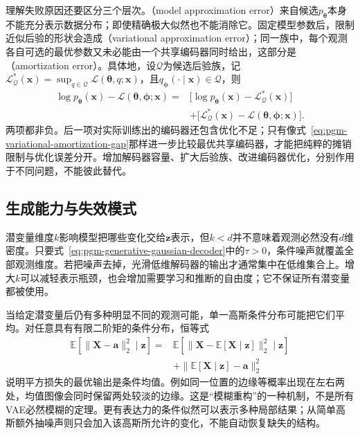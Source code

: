 理解失败原因还要区分三个层次。（model approximation error）来自候选$p_{\bm{\theta}}$本身不能充分表示数据分布；即使精确极大似然也不能消除它。固定模型参数后，限制近似后验的形状会造成（variational approximation error）；同一族中，每个观测各自可选的最优参数又未必能由一个共享编码器同时给出，这部分是（amortization error）。具体地，设$\mathcal{Q}$为候选后验族，记$\mathcal{L}_{\mathcal{Q}}^*(\bm{x})=\sup_{q\in\mathcal{Q}}\mathcal{L}(\bm{\theta},q;\bm{x})$，且$q_{\bm{\phi}}(\cdot\mid\bm{x})\in\mathcal{Q}$，则
\begin{equation}
  \label{eq:pgm-generative-inference-gaps}
  \begin{aligned}
    \log p_{\bm{\theta}}(\bm{x})
      -\mathcal{L}(\bm{\theta},\bm{\phi};\bm{x})
    ={}&\bigl[\log p_{\bm{\theta}}(\bm{x})
             -\mathcal{L}_{\mathcal{Q}}^*(\bm{x})\bigr]\\
       &+\bigl[\mathcal{L}_{\mathcal{Q}}^*(\bm{x})
             -\mathcal{L}(\bm{\theta},\bm{\phi};\bm{x})\bigr].
  \end{aligned}
\end{equation}
两项都非负。后一项对实际训练出的编码器还包含优化不足；只有像式~\eqref{eq:pgm-variational-amortization-gap}那样进一步比较最优共享编码器，才能把纯粹的摊销限制与优化误差分开。增加解码器容量、扩大后验族、改进编码器优化，分别作用于不同问题，不能彼此替代。

\subsection{生成能力与失效模式}
\label{sec:pgm-generative-vae-failure}

潜变量维度$k$影响模型把哪些变化交给$\bm{z}$表示，但$k<d$并不意味着观测必然没有$d$维密度。只要式~\eqref{eq:pgm-generative-gaussian-decoder}中的$\tau>0$，条件噪声就覆盖全部观测维度。若把噪声去掉，光滑低维解码器的输出才通常集中在低维集合上。增大$k$可以减轻表示瓶颈，也会增加需要学习和推断的自由度；它不保证所有潜变量都被使用。

当给定潜变量后仍有多种明显不同的观测可能，单一高斯条件分布可能把它们平均。对任意具有有限二阶矩的条件分布，恒等式
\[
  \begin{aligned}
    \mathbb{E}[\lVert\bm{X}-\bm{a}\rVert_2^2\mid\bm{z}]
    ={}&\mathbb{E}[\lVert\bm{X}-\mathbb{E}[\bm{X}\mid\bm{z}]
                     \rVert_2^2\mid\bm{z}]\\
       &+\lVert\mathbb{E}[\bm{X}\mid\bm{z}]-\bm{a}\rVert_2^2
  \end{aligned}
\]
说明平方损失的最优输出是条件均值。例如同一位置的边缘等概率出现在左右两处，均值图像会同时保留两处较淡的边缘。这是“模糊重构”的一种机制，不是所有VAE必然模糊的定理。更有表达力的条件似然可以表示多种局部结果；从简单高斯额外抽噪声则只会加入该高斯所允许的变化，不能自动恢复缺失的结构。

